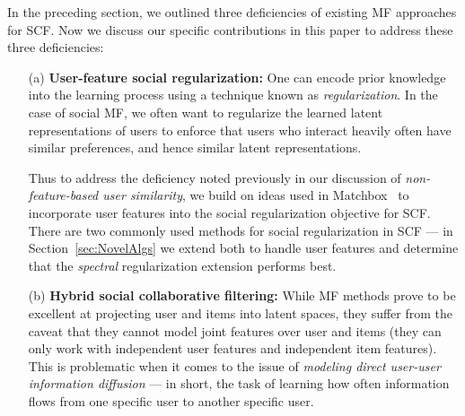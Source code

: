 \documentclass{sig-alternate}
\begin{document}
In the preceding section, we outlined three deficiencies of existing MF
approaches for SCF.  Now we discuss our specific
contributions in this paper to address these three deficiencies:
\begin{enumerate}
\item[(a)] {\bf User-feature social regularization:} One can encode
prior knowledge into the learning process using a technique known as
\emph{regularization}.  In the case of social MF, we often want to
regularize the learned latent representations of users to enforce that
users who interact heavily often have similar preferences, and hence
similar latent representations.  

Thus to address the deficiency noted previously in our discussion of 
\emph{non-feature-based user similarity}, we build on ideas used in
Matchbox~\cite{matchbox} to incorporate user features into the social
regularization objective for SCF.  There are two commonly used methods
for social regularization in SCF --- in Section~\ref{sec:NovelAlgs} we
extend both to handle user features and determine that the
\emph{spectral} regularization extension performs best.
\item[(b)] {\bf Hybrid social collaborative filtering:} While MF
methods prove to be excellent at projecting user and items into latent
spaces, they suffer from the caveat that they cannot model joint
features over user and items (they can only work with independent user
features and independent item features).  This is problematic when it
comes to the issue of \emph{modeling direct user-user information
diffusion} --- in short, the task of learning how often information
flows from one specific user to another specific user.  


\end{enumerate}
\end{document}

